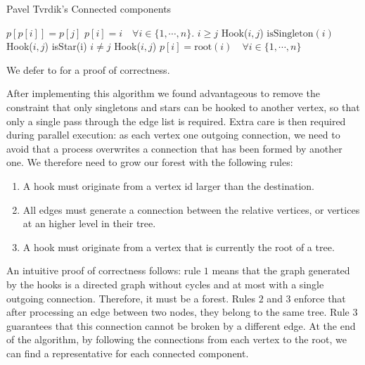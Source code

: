 \begin{algorithm}[H]
    \caption{Pavel Tvrdik's Connected components}
    \label{algorithm:cc1}
    \begin{algorithmic}[1]
          \State $p[p[i]] = p[j]$
        \EndProcedure
          \State $p[i] = i \quad \forall i \in \{1,\cdots, n\}$. 
         
          \State  \kif $i\ge j$ \kthen Hook($i, j$)
          \State  \kif $\text{isSingleton}(i)$ \kthen Hook($i, j$)
        \EndFor
         
          \State  \kif isStar(i) \kand $i \neq j$ \kthen Hook($i, j$)
        \EndFor
        \State $p[i] = \text{root}(i) \quad \forall i \in \{1,\cdots, n\}$ 
        \EndWhile
        \EndProcedure
   \end{algorithmic}
\end{algorithm}
We defer to \cite{PCompClass} for a proof of correctness.

After implementing this algorithm we found advantageous to remove the constraint that only
singletons and stars can be hooked to another vertex, so that only a single pass through
the edge list is required. Extra care is then required during parallel execution: as each vertex
 one outgoing connection, we need to avoid that a process overwrites a
connection that has been formed by another one.
We therefore need to grow our forest with the following rules:

\begin{enumerate}
    \item A hook must originate from a vertex id larger than the destination.
    \item All edges must generate a connection between the relative vertices, or vertices at an
higher level in their tree.
    \item A hook must originate from a vertex that is currently the root of a tree.
\end{enumerate}

An intuitive proof of correctness follows: rule $1$ means that the graph generated
by the hooks is a directed graph without cycles and
 at most with a single outgoing connection. Therefore, it must be a forest.
Rules $2$ and $3$ enforce that after processing an edge between two nodes, they belong to the same
tree. Rule $3$ guarantees that this connection cannot be broken by a different edge.
At the end of the algorithm, by following the connections from each vertex to the root, we
can find a representative for each connected component.

